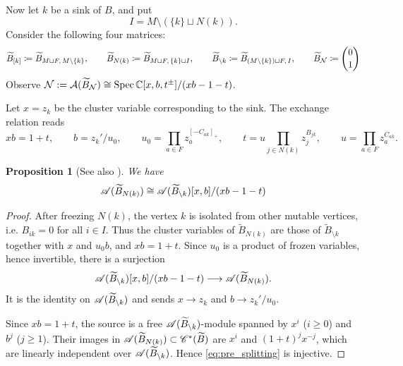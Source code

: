 \documentclass[12pt, letter]{amsart}
\newtheorem{proposition}[dummy]{Proposition}
\theoremstyle{definition}
\begin{document}
Now let $k$ be a sink of $B$, and put
\[
 I=M\setminus(\{k\}\sqcup N(k)).
\]
 Consider the following four matrices:  
\begin{equation}
    \label{eq:matrices_B}
\widetilde B_{[k]}\coloneqq\widetilde B_{M\sqcup F,\,M\setminus\{k\}}, \qquad 
\widetilde B_{N(k)} \coloneqq \widetilde B_{M\sqcup F,\,\{k\}\sqcup I}, \qquad
 \widetilde B_{\setminus k} \coloneqq \widetilde B_{(M\setminus\{k\})\sqcup F,\,I}
, \qquad
\widetilde B_{\mathcal{N}} \coloneqq \binom01
\end{equation}
Observe \( \mathcal{N}  := \mathcal{A}(\widetilde B_{\mathcal{N}}) \cong \operatorname{Spec}\mathbb{C}[x, b, t^\pm]/ (xb - 1 - t)\).  







Let \(x = z_k\) be the cluster variable corresponding to the sink. The exchange relation reads
\begin{equation}
\label{eq:sink_exchange}
 xb=1+t,\qquad 
 b=z_k'/u_0,\qquad u_0=\prod_{a\in F}z_a^{[-C_{ak}]_+},\qquad
 t=u\prod_{j\in N(k)}z_j^{B_{jk}},\qquad u=\prod_{a\in F}z_a^{C_{ak}}.
\end{equation}


\begin{proposition}[See also {\cite[(4.16)]{Hlavinka}}]
\label{prop:AB_Nk}
We have 
\[
 \mathscr{A}(\widetilde B_{N(k)}) \cong \mathscr{A}(\widetilde B_{\setminus k})[x,b]/(xb-1-t)
\]
\end{proposition}
\begin{proof}
After freezing \(N(k)\), the vertex \(k\) is isolated from other mutable vertices, i.e. \(B_{ik} = 0 \) for all \( i \in I\).  Thus the cluster variables of \( \widetilde B_{N(k)}\) are those of \( \widetilde B_{\setminus k}\) together with \(x \) and \( u_0 b\), and \( xb = 1 +t\). Since \(u_0\) is a product of frozen variables, hence invertible, 
there is a surjection
\begin{equation}
\label{eq:pre_splitting}
 \mathscr{A}(\widetilde B_{\setminus k})[x,b]/(xb-1-t)\longrightarrow\mathscr{A}(\widetilde B_{N(k)}).
\end{equation}
It is the identity on $\mathscr{A}(\widetilde B_{\setminus k})$ and sends $x\to z_k$ and $b\to z_k'/u_0$.



Since $xb=1+t$, the source is a free $\mathscr{A}(\widetilde B_{\setminus k})$-module spanned by $x^i$ ($i\ge0$) and $b^j$ ($j\ge1$).
Their images in $ \mathscr{A}(\widetilde B_{N(k)})\subset  \mathscr{C}^*(\widetilde B)$ are $x^i$ and $(1+t)^jx^{-j}$, which are linearly independent over \(\mathscr{A}(\widetilde B_{\setminus k})\). 
Hence \eqref{eq:pre_splitting} is injective.
\end{proof}
\end{document}
